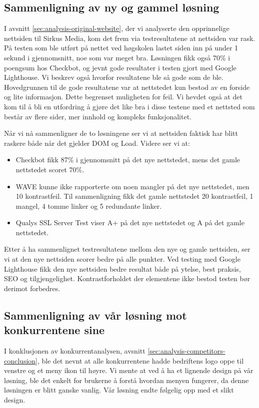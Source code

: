 \subsection{Sammenligning av ny og gammel løsning}
I avsnitt \ref{sec:analysis-original-website}, der vi analyserte den opprinnelige nettsiden til Sirkus Media, kom det frem via testresultatene at nettsiden var rask. På testen som ble utført på nettet ved høgskolen lastet siden inn på under 1 sekund i gjennomsnitt, noe som var meget bra. Løsningen fikk også 70\% i poengsum hos Checkbot, og jevnt gode resultater i testen gjort med Google Lighthouse. Vi beskrev også hvorfor resultatene ble så gode som de ble. Hovedgrunnen til de gode resultatene var at nettstedet kun bestod av en forside og lite informasjon. Dette begrenset muligheten for feil. Vi hevdet også at det kom til å bli en utfordring å gjøre det like bra i disse testene med et nettsted som består av flere sider, mer innhold og kompleks funksjonalitet.

Når vi nå sammenligner de to løsningene ser vi at nettsiden faktisk har blitt raskere både når det gjelder DOM og Load. Videre ser vi at:

\begin{itemize}
    \item Checkbot fikk 87\% i gjennomsnitt på det nye nettstedet, mens det gamle nettstedet scoret 70\%. 
    \item WAVE kunne ikke rapporterte om noen mangler på det nye nettstedet, men 10 kontrastfeil. Til sammenligning fikk det gamle nettstedet 20 kontrastfeil, 1 mangel, 4 tomme linker og 5 redundante linker.
    \item Qualys SSL Server Test viser A+ på det nye nettstedet og A på det gamle nettstedet.
\end{itemize}

Etter å ha sammenlignet testresultatene mellom den nye og gamle nettsiden, ser vi at den nye nettsiden scorer bedre på alle punkter. Ved testing med Google Lighthouse fikk den nye nettsiden bedre resultat både på ytelse, best praksis, SEO og tilgjengelighet. Kontrastforholdet der elementene ikke bestod testen bør derimot forbedres.

\subsection{Sammenligning av vår løsning mot konkurrentene sine}
I konklusjonen av konkurrentanalysen, avsnitt \ref{sec:analysis-competitors-conclusion}, ble det nevnt at alle konkurrentene hadde bedriftens logo oppe til venstre og et meny ikon til høyre. Vi mente at ved å ha et lignende design på vår løsning, ble det enkelt for brukerne å forstå hvordan menyen fungerer, da denne løsningen er blitt ganske vanlig. Vår løsning endte følgelig opp med et slikt design.

